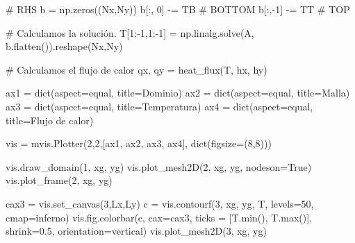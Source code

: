 \documentclass[
  letterpaper,
  DIV=11,
  numbers=noendperiod]{scrreprt}
\newenvironment{Shaded}{\begin{snugshade}}{\end{snugshade}}
\newcommand{\BuiltInTok}[1]{\textcolor[rgb]{0.00,0.23,0.31}{#1}}
\newcommand{\CommentTok}[1]{\textcolor[rgb]{0.37,0.37,0.37}{#1}}
\newcommand{\DecValTok}[1]{\textcolor[rgb]{0.68,0.00,0.00}{#1}}
\newcommand{\FloatTok}[1]{\textcolor[rgb]{0.68,0.00,0.00}{#1}}
\newcommand{\NormalTok}[1]{\textcolor[rgb]{0.00,0.23,0.31}{#1}}
\newcommand{\OperatorTok}[1]{\textcolor[rgb]{0.37,0.37,0.37}{#1}}
\newcommand{\StringTok}[1]{\textcolor[rgb]{0.13,0.47,0.30}{#1}}
\newcommand{\VariableTok}[1]{\textcolor[rgb]{0.07,0.07,0.07}{#1}}
\begin{document}
\begin{Shaded}
\begin{Highlighting}[]
    \CommentTok{\# RHS}
\NormalTok{    b }\OperatorTok{=}\NormalTok{ np.zeros((Nx,Ny))}
\NormalTok{    b[:, }\DecValTok{0}\NormalTok{] }\OperatorTok{{-}=}\NormalTok{ TB  }\CommentTok{\# BOTTOM}
\NormalTok{    b[:,}\OperatorTok{{-}}\DecValTok{1}\NormalTok{] }\OperatorTok{{-}=}\NormalTok{ TT  }\CommentTok{\# TOP}

    \CommentTok{\# Calculamos la solución.}
\NormalTok{    T[}\DecValTok{1}\NormalTok{:}\OperatorTok{{-}}\DecValTok{1}\NormalTok{,}\DecValTok{1}\NormalTok{:}\OperatorTok{{-}}\DecValTok{1}\NormalTok{] }\OperatorTok{=}\NormalTok{ np.linalg.solve(A, b.flatten()).reshape(Nx,Ny)}

    \CommentTok{\# Calculamos el flujo de calor}
\NormalTok{    qx, qy }\OperatorTok{=}\NormalTok{ heat\_flux(T, hx, hy)}

\NormalTok{    ax1 }\OperatorTok{=} \BuiltInTok{dict}\NormalTok{(aspect}\OperatorTok{=}\StringTok{\textquotesingle{}equal\textquotesingle{}}\NormalTok{, title}\OperatorTok{=}\StringTok{\textquotesingle{}Dominio\textquotesingle{}}\NormalTok{)}
\NormalTok{    ax2 }\OperatorTok{=} \BuiltInTok{dict}\NormalTok{(aspect}\OperatorTok{=}\StringTok{\textquotesingle{}equal\textquotesingle{}}\NormalTok{, title}\OperatorTok{=}\StringTok{\textquotesingle{}Malla\textquotesingle{}}\NormalTok{)}
\NormalTok{    ax3 }\OperatorTok{=} \BuiltInTok{dict}\NormalTok{(aspect}\OperatorTok{=}\StringTok{\textquotesingle{}equal\textquotesingle{}}\NormalTok{, title}\OperatorTok{=}\StringTok{\textquotesingle{}Temperatura\textquotesingle{}}\NormalTok{)}
\NormalTok{    ax4 }\OperatorTok{=} \BuiltInTok{dict}\NormalTok{(aspect}\OperatorTok{=}\StringTok{\textquotesingle{}equal\textquotesingle{}}\NormalTok{, title}\OperatorTok{=}\StringTok{\textquotesingle{}Flujo de calor\textquotesingle{}}\NormalTok{)}

\NormalTok{    vis }\OperatorTok{=}\NormalTok{ mvis.Plotter(}\DecValTok{2}\NormalTok{,}\DecValTok{2}\NormalTok{,[ax1, ax2, ax3, ax4],}
                      \BuiltInTok{dict}\NormalTok{(figsize}\OperatorTok{=}\NormalTok{(}\DecValTok{8}\NormalTok{,}\DecValTok{8}\NormalTok{)))}
    
\NormalTok{    vis.draw\_domain(}\DecValTok{1}\NormalTok{, xg, yg)}
\NormalTok{    vis.plot\_mesh2D(}\DecValTok{2}\NormalTok{, xg, yg, nodeson}\OperatorTok{=}\VariableTok{True}\NormalTok{)}
\NormalTok{    vis.plot\_frame(}\DecValTok{2}\NormalTok{, xg, yg)}
    
\NormalTok{    cax3 }\OperatorTok{=}\NormalTok{ vis.set\_canvas(}\DecValTok{3}\NormalTok{,Lx,Ly)}
\NormalTok{    c }\OperatorTok{=}\NormalTok{ vis.contourf(}\DecValTok{3}\NormalTok{, xg, yg, T, levels}\OperatorTok{=}\DecValTok{50}\NormalTok{, cmap}\OperatorTok{=}\StringTok{\textquotesingle{}inferno\textquotesingle{}}\NormalTok{)}
\NormalTok{    vis.fig.colorbar(c, cax}\OperatorTok{=}\NormalTok{cax3, ticks }\OperatorTok{=}\NormalTok{ [T.}\BuiltInTok{min}\NormalTok{(), T.}\BuiltInTok{max}\NormalTok{()], shrink}\OperatorTok{=}\FloatTok{0.5}\NormalTok{, orientation}\OperatorTok{=}\StringTok{\textquotesingle{}vertical\textquotesingle{}}\NormalTok{)}
\NormalTok{    vis.plot\_mesh2D(}\DecValTok{3}\NormalTok{, xg, yg)}
    

\end{Highlighting}
\end{Shaded}
\end{document}
